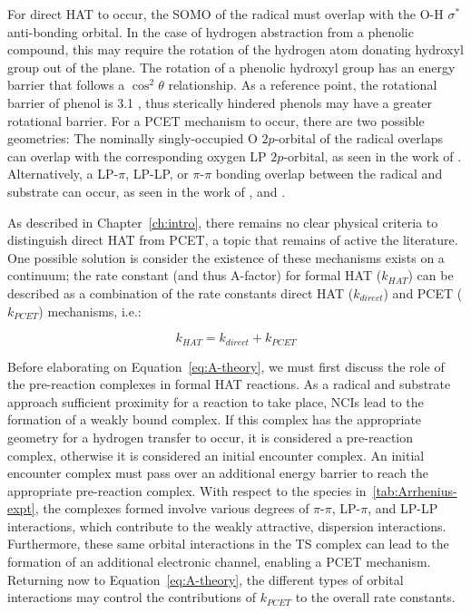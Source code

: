 For direct HAT to occur, the SOMO of the radical must overlap with the O-H
$\sigma^*$ anti-bonding orbital. In the case of hydrogen abstraction from a
phenolic compound, this may require the rotation of the hydrogen atom donating
hydroxyl group out of the plane. The rotation of a phenolic hydroxyl group has
an energy barrier that follows a $\cos^2 \theta$ relationship.\cite{Kojima1960}
As a reference point, the rotational barrier of phenol\cite{Kim1994} is 3.1
\kcalmol, thus sterically hindered phenols may have a greater rotational
barrier. For a PCET mechanism to occur, there are two possible geometries:
The nominally singly-occupied O $2p$-orbital of the radical overlaps can
overlap with the corresponding oxygen LP $2p$-orbital, as seen in the work of
\citet{Mayer2002}. Alternatively, a LP-$\pi$, LP-LP, or $\pi$-$\pi$ bonding
overlap between the radical and substrate can occur, as seen in the work of
\citet{DiLabio2005}, and \citet{DiLabio2007}.

As described in Chapter~\ref{ch:intro}, there remains no clear physical criteria
to distinguish direct HAT from PCET, a topic that remains of active the
literature.\cite{Cukier1998, Mayer2002, Stubbe2003, Mayer2004, DiLabio2007,
Huynh2007, HammesSchiffer2008, Mayer2010, Weinberg2012, HammesSchiffer2015,
MunozRugeles2017} One possible solution is consider the existence of these
mechanisms exists on a continuum; the rate constant (and thus A-factor) for
formal HAT ($k_{HAT}$) can be described as a combination of the rate constants
direct HAT ($k_{direct}$) and PCET ($k_{PCET}$) mechanisms, i.e.:

\begin{equation}
  k_{HAT} = k_{direct} + k_{PCET}
  \label{eq:A-theory}
\end{equation}

Before elaborating on Equation~\ref{eq:A-theory}, we must first discuss the role
of the pre-reaction complexes in formal HAT reactions. As a radical and
substrate approach sufficient proximity for a reaction to take place, NCIs lead
to the formation of a weakly bound complex. If this complex has the appropriate
geometry for a hydrogen transfer to occur, it is considered a pre-reaction
complex, otherwise it is considered an initial encounter complex. An initial
encounter complex must pass over an additional energy barrier to reach the
appropriate pre-reaction complex. With respect to the species
in~\ref{tab:Arrhenius-expt}, the complexes formed involve various degrees of
$\pi$-$\pi$, LP-$\pi$, and LP-LP interactions, which contribute to the weakly
attractive, dispersion interactions. Furthermore, these same orbital
interactions in the TS complex can lead to the formation of an additional
electronic channel, enabling a PCET mechanism.\cite{DiLabio2005, DiLabio2007}
Returning now to Equation~\ref{eq:A-theory}, the different types of orbital
interactions may control the contributions of $k_{PCET}$ to the overall rate
constants.

